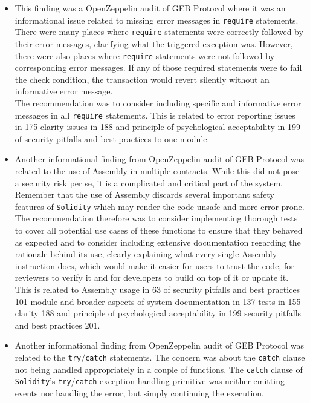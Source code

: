 \begin{itemize}
\item
  This finding was a OpenZeppelin audit of GEB Protocol where it was an
  informational issue related to missing error messages in
  \texttt{require} statements. There were many places where
  \texttt{require} statements were correctly followed by their error
  messages, clarifying what the triggered exception was. However, there
  were also places where \texttt{require} statements were not followed
  by corresponding error messages. If any of those required statements
  were to fail the check condition, the transaction would revert
  silently without an informative error message.\\

  The recommendation was to consider including specific and informative
  error messages in all \texttt{require} statements. This is related to
  error reporting issues in 175 clarity issues in 188 and principle of
  psychological acceptability in 199 of security pitfalls and best
  practices to one module.
\item
  Another informational finding from OpenZeppelin audit of GEB Protocol
  was related to the use of Assembly in multiple contracts. While this
  did not pose a security risk per se, it is a complicated and critical
  part of the system. Remember that the use of Assembly discards several
  important safety features of \texttt{Solidity} which may render the
  code unsafe and more error-prone.\\

  The recommendation therefore was to consider implementing thorough
  tests to cover all potential use cases of these functions to ensure
  that they behaved as expected and to consider including extensive
  documentation regarding the rationale behind its use, clearly
  explaining what every single Assembly instruction does, which would
  make it easier for users to trust the code, for reviewers to verify it
  and for developers to build on top of it or update it.\\

  This is related to Assembly usage in 63 of security pitfalls and best
  practices 101 module and broader aspects of system documentation in
  137 tests in 155 clarity 188 and principle of psychological
  acceptability in 199 security pitfalls and best practices 201.
\item
  Another informational finding from OpenZeppelin audit of GEB Protocol
  was related to the \texttt{try}/\texttt{catch} statements. The concern
  was about the \texttt{catch} clause not being handled appropriately in
  a couple of functions. The \texttt{catch} clause of
  \texttt{Solidity}'s \texttt{try}/\texttt{catch} exception handling
  primitive was neither emitting events nor handling the error, but
  simply continuing the execution.\\


\end{itemize}
